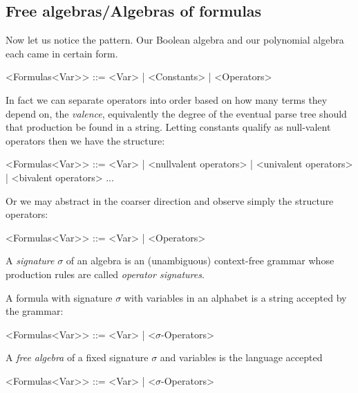 \subsection{Free algebras/Algebras of formulas}
Now let us notice the pattern.  Our Boolean algebra and our polynomial algebra each 
came in certain form.
\begin{Gcode}[]
    <Formulas<Var>> ::= <Var>
            | <Constants>
            | <Operators>
\end{Gcode}
In fact we can separate operators into order based on how many terms they depend on,
the \emph{valence}, equivalently the degree of the eventual parse tree should that 
production be found in a string.  Letting constants qualify as null-valent operators 
then we have the structure:
\begin{Gcode}[]
    <Formulas<Var>> ::= <Var>
            | <nullvalent operators>
            | <univalent operators>
            | <bivalent operators>
            ...
\end{Gcode}
Or we may abstract in the coarser direction and observe simply the structure operators:
\begin{Gcode}[]
    <Formulas<Var>> ::= <Var>
                      | <Operators>
\end{Gcode}

\begin{definition}
    A \emph{signature} $\sigma$ of an algebra is an (unambiguous) context-free grammar 
     whose production rules are called \emph{operator signatures}.

    A formula with signature $\sigma$ with variables in an alphabet  
    is a string accepted by the grammar:
    \begin{Gcode}[]
        <Formulas<Var>> ::= <Var> | <$\sigma$-Operators>
    \end{Gcode}
\end{definition}


\begin{definition}
    A \emph{free algebra} of a fixed signature $\sigma$ and variables 
    is the language accepted 
    \begin{Gcode}[]
        <Formulas<Var>> ::= <Var> | <$\sigma$-Operators>
    \end{Gcode}
\end{definition}